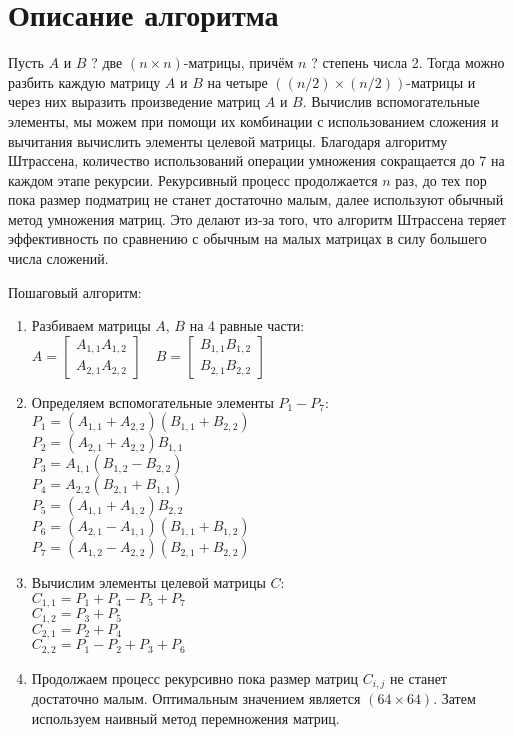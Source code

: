 \documentclass{report}
\begin{document}
\section*{Описание алгоритма}
\par Пусть $A$ и $B$ ? две $(n \times n)$-матрицы, причём $n$ ? степень числа 2. Тогда можно разбить каждую матрицу $A$ и $B$ на четыре $((n/2) \times (n/2))$-матрицы и через них выразить произведение матриц $A$ и $B$. Вычислив вспомогательные элементы, мы можем при помощи их комбинации с использованием сложения и вычитания вычислить элементы целевой матрицы. Благодаря алгоритму Штрассена, количество использований операции умножения сокращается до 7 на каждом этапе рекурсии. Рекурсивный процесс продолжается $n$ раз, до тех пор пока размер подматриц не станет достаточно малым, далее используют обычный метод умножения матриц. Это делают из-за того, что алгоритм Штрассена теряет эффективность по сравнению с обычным на малых матрицах в силу большего числа сложений.
\par Пошаговый алгоритм:
\begin{enumerate}
\item Разбиваем матрицы $A$, $B$ на 4 равные части:
\\ $A = 
\begin{bmatrix} A_{1,1} A_{1,2} \\ A_{2,1} A_{2,2} \end{bmatrix}
\quad B = 
\begin{bmatrix} B_{1,1} B_{1,2} \\ B_{2,1} B_{2,2} \end{bmatrix}$
\item Определяем вспомогательные элементы $P_1 - P_7$:
\\ $P_1 = (A_{1,1} + A_{2,2})(B_{1,1} + B_{2,2})$
\\ $P_2 = (A_{2,1} + A_{2,2})B_{1,1}$
\\ $P_3 = A_{1,1}(B_{1,2} - B_{2,2})$
\\ $P_4 = A_{2,2}(B_{2,1} + B_{1,1})$
\\ $P_5 = (A_{1,1} + A_{1,2})B_{2,2}$
\\ $P_6 = (A_{2,1} - A_{1,1})(B_{1,1} + B_{1,2})$
\\ $P_7 = (A_{1,2} - A_{2,2})(B_{2,1} + B_{2,2})$
\item Вычислим элементы целевой матрицы $C$:
\\ $C_{1,1} = P_1 + P_4 - P_5 + P_7$
\\ $C_{1,2} = P_3 + P_5$
\\ $C_{2,1} = P_2 + P_4$
\\ $C_{2,2} = P_1 - P_2 + P_3 + P_6$
\item Продолжаем процесс рекурсивно пока размер матриц $C_{i,j}$ не станет достаточно малым. Оптимальным значением является $(64\times64)$. Затем используем наивный метод перемножения матриц.
\end{enumerate}
\newpage
\end{document}

